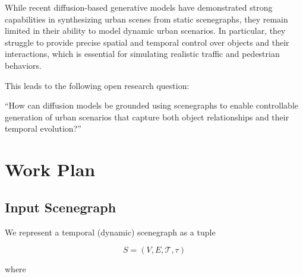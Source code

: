 \documentclass{article}
\begin{document}
While recent diffusion-based generative models have demonstrated strong capabilities in synthesizing urban scenes from static scenegraphs, they remain limited in their ability to model dynamic urban scenarios. In particular, they struggle to provide precise spatial and temporal control over objects and their interactions, which is essential for simulating realistic traffic and pedestrian behaviors.

This leads to the following open research question:

“How can diffusion models be grounded using scenegraphs to enable controllable generation of urban scenarios that capture both object relationships and their temporal evolution?”

\section{Work Plan}

\subsection{Input Scenegraph}

We represent a temporal (dynamic) scenegraph as a tuple

\begin{equation}
S = (V, E, \mathcal{T}, \tau)
\end{equation}

where
\end{document}
